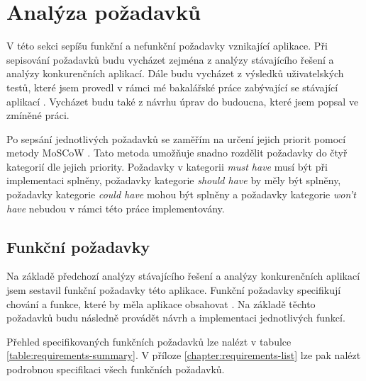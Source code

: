 ﻿%
\section{Analýza požadavků}

V této sekci sepíšu funkční a nefunkční požadavky vznikající aplikace. Při sepisování požadavků budu vycházet zejména z analýzy stávajícího řešení a analýzy konkurenčních aplikací. Dále budu vycházet z výsledků uživatelských testů, které jsem provedl v rámci mé bakalářské práce zabývající se stávající aplikací \cite{Jenicek2024BachelorThesis}. Vycházet budu také z návrhu úprav do budoucna, které jsem popsal ve zmíněné práci.

Po sepsání jednotlivých požadavků se zaměřím na určení jejich priorit pomocí metody MoSCoW \cite{Moscow}. Tato metoda umožňuje snadno rozdělit požadavky do čtyř kategorií dle jejich priority. Požadavky v kategorii \textit{must have} musí být při implementaci splněny, požadavky kategorie \textit{should have} by měly být splněny, požadavky kategorie \textit{could have} mohou být splněny a požadavky kategorie \textit{won't have} nebudou v rámci této práce implementovány.

\subsection{Funkční požadavky}

Na základě předchozí analýzy stávajícího řešení a analýzy konkurenčních aplikací jsem sestavil funkční požadavky této aplikace. Funkční požadavky specifikují chování a funkce, které by měla aplikace obsahovat \cite[4]{UseCases}. Na základě těchto požadavků budu následně provádět návrh a implementaci jednotlivých funkcí.

Přehled specifikovaných funkčních požadavků lze nalézt v tabulce \ref{table:requirements-summary}. V příloze \ref{chapter:requirements-list} lze pak nalézt podrobnou specifikaci všech funkčních požadavků.

